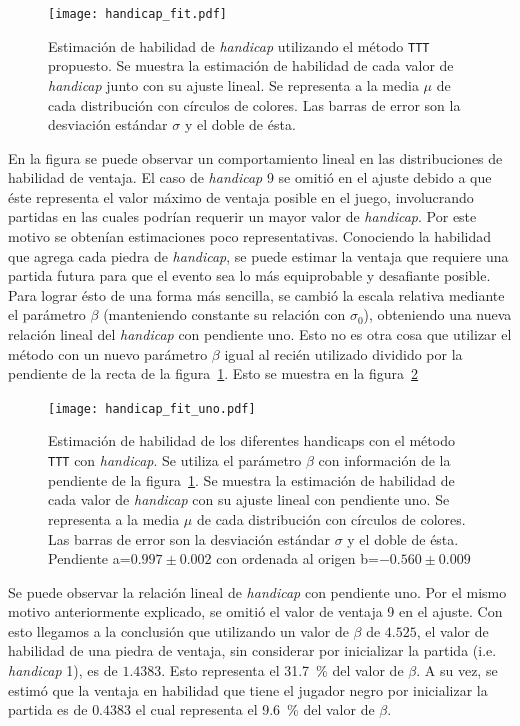 \documentclass[11pt,twoside,spanish]{report} %
\begin{document}
\begin{figure}[H]
	\centering
	\texttt{[image: handicap\_fit.pdf]}
	\caption{Estimaci\'on de habilidad de \textit{handicap} utilizando el m\'etodo \texttt{TTT} propuesto. Se muestra la estimaci\'on de habilidad de cada valor de \textit{handicap} junto con su ajuste lineal. Se representa a la media $\mu$ de cada distribuci\'on con c\'irculos de colores.  Las barras de error son la desviaci\'on est\'andar $\sigma$ y el doble de \'esta. }
	\label{fig:handicapFIT}
\end{figure}


En la figura se puede observar un comportamiento lineal en las distribuciones de habilidad de ventaja.
El caso de \textit{handicap} 9 se omiti\'o en el ajuste debido a que \'este representa el valor m\'aximo de ventaja posible en el juego, involucrando partidas en las cuales podr\'ian requerir un mayor valor de \textit{handicap}.
Por este motivo se obten\'ian estimaciones poco representativas.
Conociendo la habilidad que agrega cada piedra de \textit{handicap}, se puede estimar la ventaja que requiere una partida futura para que el evento sea lo m\'as equiprobable y desafiante posible.
Para lograr \'esto de una forma m\'as sencilla, se cambi\'o la escala relativa mediante el par\'ametro $\beta$ (manteniendo constante su relaci\'on con $\sigma_0$), obteniendo una nueva relaci\'on lineal del \textit{handicap} con pendiente uno.
Esto no es otra cosa que utilizar el m\'etodo con un nuevo par\'ametro $\beta$ igual al reci\'en utilizado dividido por la pendiente de la recta de la figura~\ref{fig:handicapFIT}.
Esto se muestra en la figura~\ref{fig:handicap_fit_uno}


\begin{figure}[H]
	\centering
    \texttt{[image: handicap\_fit\_uno.pdf]}
    \caption{Estimaci\'on de habilidad de los diferentes handicaps con el m\'etodo \texttt{TTT} con \textit{handicap}. Se utiliza el par\'ametro $\beta$ con informaci\'on de la pendiente de la figura~\ref{fig:handicapFIT}. Se muestra la estimaci\'on de habilidad de cada valor de \textit{handicap} con su ajuste lineal con pendiente uno. Se representa a la media $\mu$ de cada distribuci\'on con c\'irculos de colores.  Las barras de error son la desviaci\'on est\'andar $\sigma$ y el doble de \'esta.  Pendiente a=$0.997\pm0.002$ con ordenada al origen b=$-0.560\pm0.009$}
    \label{fig:handicap_fit_uno}
\end{figure}


Se puede observar la relaci\'on lineal de \textit{handicap} con pendiente uno.
Por el mismo motivo anteriormente explicado, se omiti\'o el valor de ventaja 9 en el ajuste.
Con esto llegamos a la conclusi\'on que utilizando un valor de $\beta$ de $4.525$, el valor de habilidad de una piedra de ventaja, sin considerar por inicializar la partida (i.e. \textit{handicap} 1), es de $1.4383$.
Esto representa el \SI{31.7}{\percent} del valor de $\beta$.
A su vez, se estim\'o que la ventaja en habilidad que tiene el jugador negro por inicializar la partida es de $0.4383$ el cual representa el \SI{9.6}{\percent} del valor de $\beta$.
\end{document}
